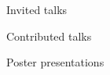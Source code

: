 \begin{itemize}[noitemsep]
{
\item{\sc Invited talks}
    
\item{\sc Contributed talks}
    
\item{\sc Poster presentations}
    
}\end{itemize}
